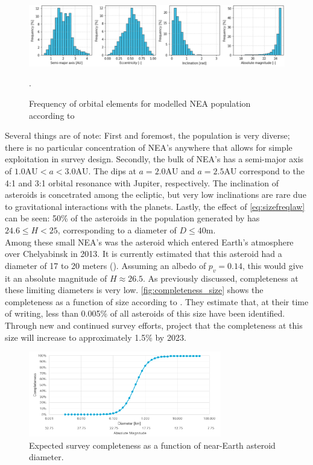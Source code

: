 \begin{figure}[htbp]
 \centering
 \includegraphics[width=1.0\textwidth]{img/population_histogram.png}
 \caption{Frequency of orbital elements for modelled NEA population according to \cite{GranvikPopulation}}.
 \label{fig:population_histogram}
\end{figure}

Several things are of note: First and foremost, the population is very diverse; there is no particular concentration of NEA's anywhere that allows for simple exploitation in survey design. Secondly, the bulk of NEA's has a semi-major axis of $1.0 \mathrm{AU} < a < 3.0 \mathrm{AU}$. The dips at $a = 2.0 \mathrm{AU}$ and $a = 2.5 \mathrm{AU}$ correspond to the 4:1 and 3:1 orbital resonance with Jupiter, respectively. The inclination of asteroids is concetrated among the ecliptic, but very low inclinations are rare due to gravitational interactions with the planets. Lastly, the effect of \autoref{eq:sizefreqlaw} can be seen: 50\% of the asteroids in the population generated by \cite{GranvikPopulation} has $24.6 \leq H < 25$, corresponding to a diameter of $D \leq 40 \mathrm{m}$. \\

Among these small NEA's was the asteroid which entered Earth's atmosphere over Chelyabinsk in 2013. It is currently estimated that this asteroid had a diameter of 17 to 20 meters (\cite{ChelyabinskNASA}). Assuming an albedo of $p_v = 0.14$, this would give it an absolute magnitude of $H \approx 26.5$. As previously discussed, completeness at these limiting diameters is very low. \autoref{fig:completeness_size} shows the completeness as a function of size according to \cite{HarrisPopulation}. They estimate that, at their time of writing, less than 0.005\% of all asteroids of this size have been identified. Through new and continued survey efforts, \cite{2017NEOSDT} project that the completeness at this size will increase to approximately 1.5\% by 2023. \\

\begin{figure}[htbp]
 \centering
 \includegraphics[width=0.75\textwidth]{img/completeness_size.png}
 \caption{Expected survey completeness as a function of near-Earth asteroid diameter. \cite{HarrisPopulation}}
 \label{fig:completeness_size}
\end{figure}

